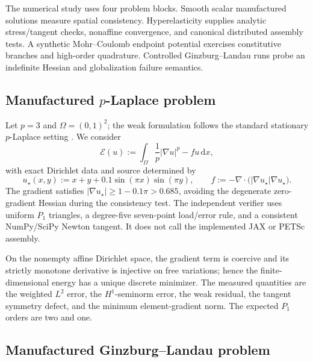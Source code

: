 \label{sec:benchmarks}

The numerical study uses four problem blocks. Smooth scalar manufactured
solutions measure spatial consistency. Hyperelasticity supplies analytic
stress/tangent checks, nonaffine convergence, and canonical distributed
assembly tests.
A synthetic Mohr--Coulomb endpoint potential exercises constitutive branches
and high-order quadrature. Controlled Ginzburg--Landau runs probe an indefinite
Hessian and globalization failure semantics.

\subsection{Manufactured \texorpdfstring{$p$-Laplace}{p-Laplace} problem}
\label{sec:bench-plaplace}

Let $p=3$ and $\Omega=(0,1)^2$; the weak formulation follows the standard
stationary $p$-Laplace setting \citep[Ch.~2]{lindqvist2019plaplace}. We consider
\begin{equation}
  \mathcal{E}(u)
  :=\int_\Omega\frac{1}{p}\lvert\nabla u\rvert^p-fu\,\mathrm{d}x,
  \label{eq:plaplace-energy}
\end{equation}
with exact Dirichlet data and source determined by
\begin{equation}
  u_\star(x,y)
  :=x+y+0.1\sin(\pi x)\sin(\pi y),
  \qquad
  f:=-\nabla\cdot
  \bigl(\lvert\nabla u_\star\rvert\nabla u_\star\bigr).
  \label{eq:plaplace-manufactured}
\end{equation}
The gradient satisfies
$\lvert\nabla u_\star\rvert\ge 1-0.1\pi>0.685$, avoiding the degenerate
zero-gradient Hessian during the consistency test. The independent verifier
uses uniform $P_1$ triangles, a degree-five seven-point load/error rule, and a
consistent NumPy/SciPy Newton tangent. It does not call the implemented JAX or
PETSc assembly.

On the nonempty affine Dirichlet space, the gradient term is coercive and its
strictly monotone derivative is injective on free variations; hence the
finite-dimensional energy has a unique discrete minimizer. The measured
quantities are the weighted $L^2$ error, the $H^1$-seminorm error, the weak
residual, the tangent symmetry defect, and the minimum element-gradient norm.
The expected $P_1$ orders are two and one.

\subsection{Manufactured Ginzburg--Landau problem}
\label{sec:bench-gl}

